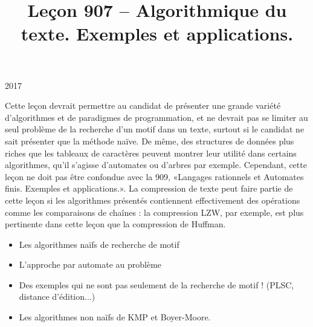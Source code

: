 \documentclass{agregfiche}
\title{Leçon 907 -- Algorithmique du texte. Exemples et applications.}
\begin{document}
\maketitle

\secrapports

\begin{rapport}{2017}

    Cette leçon devrait permettre au candidat de présenter une grande variété d’algorithmes et de paradigmes de programmation, et ne devrait pas se limiter au seul problème de la recherche d’un motif dans un texte, surtout si le candidat ne sait présenter que la méthode naïve. De même, des structures de données plus riches que les tableaux de caractères peuvent montrer leur utilité dans certains algorithmes, qu’il s’agisse d’automates ou d’arbres par exemple. Cependant, cette leçon ne doit pas être confondue avec la 909, «Langages rationnels et Automates finis. Exemples et applications.». La compression de texte peut faire partie de cette leçon si les algorithmes présentés contiennent effectivement des opérations comme les comparaisons de chaînes : la compression LZW, par exemple, est plus pertinente dans cette leçon que la compression de Huffman.

\end{rapport}

\secindispensables

\begin{itemize}
    \item Les algorithmes naïfs de recherche de motif
    \item L'approche par automate au problème
    \item Des exemples qui ne sont pas seulement de la recherche 
        de motif ! (PLSC, distance d'édition...)
    \item Les algorithmes non naïfs de KMP et Boyer-Moore.
\end{itemize}

\secpieges
\end{document}
